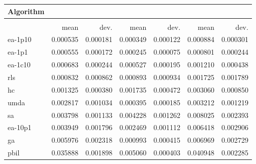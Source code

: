 \begin{tabular}{@{} l *{6}{>{{}}N{1}{2}} @{}}
\toprule
{Algorithm} &  \\
\midrule
&  &  &  \\
\midrule
& {mean} & {dev.} & {mean} & {dev.} & {mean} & {dev.} \\
\midrule
ea-1p10 & 0.000535 & 0.000181 & 0.000349 & 0.000122 & 0.000884 & 0.000301 \\
ea-1p1 & 0.000555 & 0.000172 & 0.000245 & 0.000075 & 0.000801 & 0.000244 \\
ea-1c10 & 0.000683 & 0.000244 & 0.000527 & 0.000195 & 0.001210 & 0.000438 \\
rls & 0.000832 & 0.000862 & 0.000893 & 0.000934 & 0.001725 & 0.001789 \\
hc & 0.001325 & 0.000380 & 0.001735 & 0.000472 & 0.003060 & 0.000850 \\
umda & 0.002817 & 0.001034 & 0.000395 & 0.000185 & 0.003212 & 0.001219 \\
sa & 0.003798 & 0.001133 & 0.004228 & 0.001262 & 0.008025 & 0.002393 \\
ea-10p1 & 0.003949 & 0.001796 & 0.002469 & 0.001112 & 0.006418 & 0.002906 \\
ga & 0.005976 & 0.002318 & 0.000993 & 0.000415 & 0.006969 & 0.002729 \\
pbil & 0.035888 & 0.001898 & 0.005060 & 0.000403 & 0.040948 & 0.002285 \\
\bottomrule
\end{tabular}
